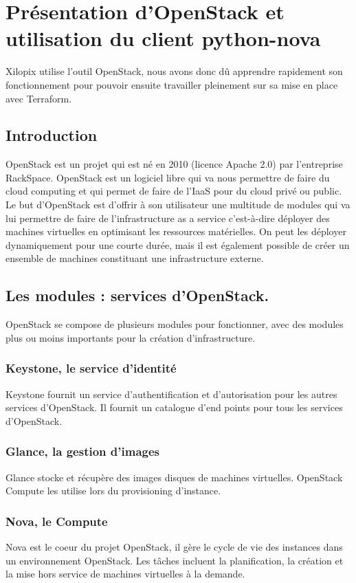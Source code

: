 \documentclass[]{article}
\begin{document}
\newpage
\section{Présentation d'OpenStack et utilisation du client python-nova}\label{OpenStack-python-nova}
Xilopix utilise l'outil OpenStack, nous avons donc dû apprendre
rapidement son fonctionnement pour pouvoir ensuite travailler pleinement
sur sa mise en place avec Terraform.
\subsection{Introduction}\label{introduction-1}
OpenStack est un projet qui est né en 2010 (licence Apache 2.0) par
l'entreprise RackSpace. OpenStack est un logiciel libre qui va nous
permettre de faire du cloud computing et qui permet de faire de l’IaaS
pour du cloud privé ou public.\\
Le but d'OpenStack est d'offrir à son
utilisateur une multitude de modules qui va lui permettre de faire de
l'infrastructure as a service c'est-à-dire déployer des machines
virtuelles en optimisant les ressources matérielles. On peut les
déployer dynamiquement pour une courte durée, mais il est également
possible de créer un ensemble de machines constituant une
infrastructure externe.

\subsection{Les modules : services
d'OpenStack.}\label{les-modules-services-dOpenStack.}
OpenStack se compose de plusieurs modules pour fonctionner, avec des
modules plus ou moins importants pour la création d'infrastructure.
\subsubsection{Keystone, le service
d'identité}\label{keystone-le-service-didentituxe9}
Keystone fournit un service d'authentification et d'autorisation pour les autres
services d'OpenStack. Il fournit un catalogue d'end points pour tous les
services d'OpenStack.
\subsubsection{Glance, la gestion
d'images}\label{glance-la-gestion-dimages}
Glance stocke et récupère des images disques de machines virtuelles. OpenStack
Compute les utilise lors du provisioning d'instance.
\subsubsection{Nova, le Compute}\label{nova-le-compute}
Nova est le coeur du projet OpenStack, il gère le cycle de vie des
instances dans un environnement OpenStack. Les tâches incluent la
planification, la création et la mise hors service de machines
virtuelles à la demande.
\end{document}
